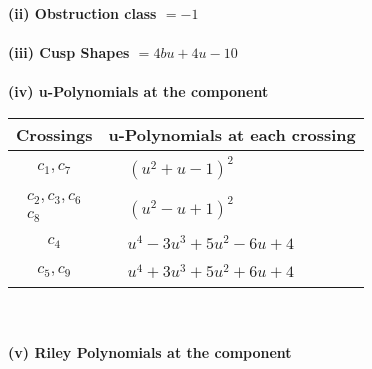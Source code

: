 \documentclass[1p]{elsarticle_modified}
\theoremstyle{definition}
\begin{document}
\flushleft \textbf{(ii) Obstruction class $= -1$}\\~\\
\flushleft \textbf{(iii) Cusp Shapes $= 4 b u+4 u-10$}\\~\\
\newpage\renewcommand{\arraystretch}{1}
\flushleft \textbf{(iv) u-Polynomials at the component}\newline \\
\begin{tabular}{m{50pt}|m{274pt}}
Crossings & \hspace{64pt}u-Polynomials at each crossing \\
\hline $$\begin{aligned}c_{1},c_{7}\end{aligned}$$&$\begin{aligned}
&(u^2+u-1)^2
\end{aligned}$\\
\hline $$\begin{aligned}c_{2},c_{3},c_{6}\\c_{8}\end{aligned}$$&$\begin{aligned}
&(u^2- u+1)^2
\end{aligned}$\\
\hline $$\begin{aligned}c_{4}\end{aligned}$$&$\begin{aligned}
&u^4-3 u^3+5 u^2-6 u+4
\end{aligned}$\\
\hline $$\begin{aligned}c_{5},c_{9}\end{aligned}$$&$\begin{aligned}
&u^4+3 u^3+5 u^2+6 u+4
\end{aligned}$\\
\hline
\end{tabular}\\~\\
\newpage\renewcommand{\arraystretch}{1}
\flushleft \textbf{(v) Riley Polynomials at the component}\newline \\
\end{document}
